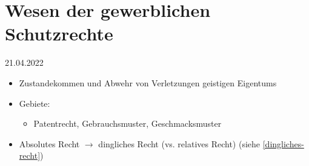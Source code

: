 \documentclass{report}
\begin{document}
\section{Wesen der gewerblichen Schutzrechte}
21.04.2022
\begin{itemize}
	\item Zustandekommen und Abwehr von Verletzungen geistigen Eigentums
	\item Gebiete:
	\begin{itemize}
		\item Patentrecht, Gebrauchsmuster, Geschmacksmuster
	\end{itemize}
	\item Absolutes Recht $\rightarrow$ dingliches Recht (vs. relatives Recht) (siehe \ref{dingliches-recht})
\end{itemize}
\end{document}
